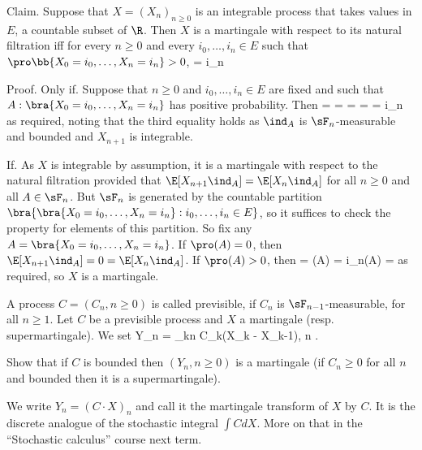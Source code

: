 Claim. Suppose that $X = (X_n)_{n\geq 0}$ is an integrable process that takes values in $E$, a countable subset of $\R$. Then $X$ is a martingale with respect to its natural filtration iff for every $n \geq 0$ and every $i_0, \dots , i_n \in E$ such that $\pro\bb{X_0 = i_0, \dots ,X_n = i_n} > 0$,
\be
\E[X_{n+1}|X_0 = i_0, \dots ,X_n = i_n] = i_n
\ee

Proof. Only if. Suppose that $n \geq 0$ and $i_0, \dots , i_n\in E$ are fixed and such that $A :\bra{X_0 = i_0, \dots ,X_n = i_n}$ has positive probability. Then
\be
\E[X_{n+1}|A] =  =  =  =  = i_n
\ee
as required, noting that the third equality holds as $\ind_A$ is $\sF_n$-measurable and bounded and $X_{n+1}$ is integrable.

If. As $X$ is integrable by assumption, it is a martingale with respect to the natural filtration provided that $\E[X_{n+1}\ind_A] = \E[X_n\ind_A]$ for all $n \geq 0$ and all $A \in \sF_n$. But $\sF_n$ is generated by the countable partition $\bra{\bra{X_0 = i_0, \dots ,X_n = i_n} : i_0, \dots , i_n \in E}$, so it suffices to check the property for elements of this partition. So fix any $A = \bra{X_0 = i_0, \dots ,X_n = i_n}$. If $\pro(A) = 0$, then $\E[X_{n+1}\ind_A] = 0 = \E[X_n\ind_A]$. If $\pro(A) > 0$, then
\be
\E[X_{n+1}\ind_A] = \E[X_{n+1}|A]\pro(A) = i_n\pro(A) = \E[X_n\ind_A]
\ee
as required, so $X$ is a martingale.

\vspace{2mm}

\qcutline


\item A process $C = (C_n, n \geq  0)$ is called previsible, if $C_n$ is $\sF_{n-1}$-measurable, for all $n \geq 1$. Let $C$ be a previsible process and $X$ a martingale (resp. supermartingale). We set
\be
Y_n = \sum_{k\leq n} C_k(X_k - X_{k-1}), n .
\ee

Show that if $C$ is bounded then $(Y_n, n \geq  0)$ is a martingale (if $C_n \geq  0$ for all $n$ and bounded then it is a supermartingale).

We write $Y_n = (C \cdot X)_n$ and call it the martingale transform of $X$ by $C$. It is the discrete analogue of the stochastic integral $\int C dX$. More on that in the ``Stochastic calculus'' course next term.

